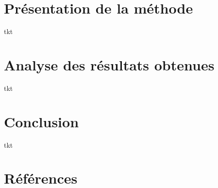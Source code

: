\documentclass[a4paper,12pt]{article}
\begin{document}
\section{Présentation de la méthode}
\label{sec:presentation2}
tkt

\section{Analyse des résultats obtenues}
\label{sec:analyse}
tkt

\section{Conclusion}
\label{sec:conclusion}
tkt

\section*{Références}
\label{sec:référence}
\end{document}
